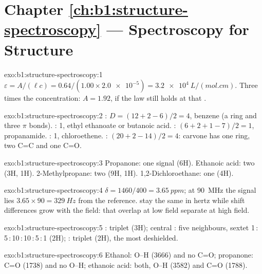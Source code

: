 \section*{Chapter \ref{ch:b1:structure-spectroscopy} --- Spectroscopy for Structure}

\begin{solution}{exo:b1:structure-spectroscopy:1}
$\varepsilon = A/(\ell c) = 0.64/(1.00 \times \num{2.0e-5}) =
\qty{3.2e4}{L/(mol.cm)}$. Three times the concentration: $A = 1.92$, if
the law still holds at that .
\end{solution}

\begin{solution}{exo:b1:structure-spectroscopy:2}
: $D = (12 + 2 - 6)/2 = 4$, benzene (a ring and three $\pi$ bonds).
: 1, ethyl ethanoate or butanoic acid. : $(6 + 2 + 1
- 7)/2 = 1$, propanamide. : 1, chloroethene. :
$(20 + 2 - 14)/2 = 4$: carvone has one ring, two C=C and one C=O.
\end{solution}

\begin{solution}{exo:b1:structure-spectroscopy:3}
Propanone: one signal (6H). Ethanoic acid: two (3H, 1H). 2-Methylpropane:
two (9H, 1H). 1,2-Dichloroethane: one (4H).
\end{solution}

\begin{solution}{exo:b1:structure-spectroscopy:4}
$\delta = 1460/400 = \qty{3.65}{ppm}$; at \qty{90}{MHz} the signal lies
$3.65 \times 90 = \qty{329}{Hz}$ from the reference. 
stay the same in hertz while shift differences grow with the field:
 that overlap at low field separate at high field.
\end{solution}

\begin{solution}{exo:b1:structure-spectroscopy:5}
: triplet (3H); central : five neighbours, sextet
1\,:\,5\,:\,10\,:\,10\,:\,5\,:\,1 (2H); : triplet (2H), the most
deshielded.
\end{solution}

\begin{solution}{exo:b1:structure-spectroscopy:6}
Ethanol: O--H (3666) and no C=O; propanone: C=O (1738) and no O--H;
ethanoic acid: both, O--H (3582) and C=O (1788).
\end{solution}

